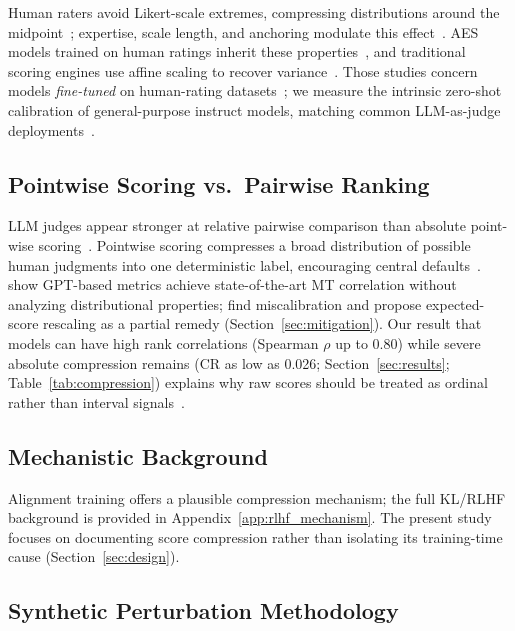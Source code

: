\documentclass[11pt]{article}
\begin{document}
Human raters avoid Likert-scale extremes, compressing distributions
around the midpoint~\citep{stevens1971issues}; expertise, scale length,
and anchoring modulate this effect~\citep{guilford1954psychometric}.
AES models trained on human ratings inherit these
properties~\citep{ke2019automated}, and traditional scoring engines use
affine scaling to recover variance~\citep{attali2006automated}. Those
studies concern models \emph{fine-tuned} on human-rating
datasets~\citep{ke2019automated}; we measure the intrinsic zero-shot
calibration of general-purpose instruct models, matching common
LLM-as-judge deployments~\citep{zheng2023judging,liu2023geval}.

\subsection{Pointwise Scoring vs.\ Pairwise Ranking}

LLM judges appear stronger at relative pairwise comparison than absolute
point-wise scoring~\citep{zheng2023judging,liu2023geval}. Pointwise
scoring compresses a broad distribution of possible human judgments into
one deterministic label, encouraging central defaults~\citep{liu2023geval,stevens1971issues}.
\citet{kocmi2023large} show GPT-based metrics achieve state-of-the-art
MT correlation without analyzing distributional properties; \citet{liu2023geval}
find miscalibration and propose expected-score rescaling as a partial
remedy (Section~\ref{sec:mitigation}). Our result that models can have
high rank correlations (Spearman $\rho$ up to 0.80) while severe
absolute compression remains (CR as low as 0.026; Section~\ref{sec:results};
Table~\ref{tab:compression}) explains why raw scores should be treated
as ordinal rather than interval signals~\citep{stevens1971issues}.

\subsection{Mechanistic Background}

Alignment training offers a plausible compression mechanism; the full KL/RLHF
background is provided in Appendix~\ref{app:rlhf_mechanism}. The present study
focuses on documenting score compression rather than isolating its training-time
cause (Section~\ref{sec:design}).

\subsection{Synthetic Perturbation Methodology}
\end{document}
